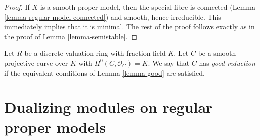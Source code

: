 \begin{proof}
If $X$ is a smooth proper model, then the special fibre is
connected (Lemma \ref{lemma-regular-model-connected})
and smooth, hence irreducible. This immediately implies that
it is minimal. The rest of the proof follows exactly as in
the proof of Lemma \ref{lemma-semistable}.
\end{proof}

\begin{definition}
\label{definition-good}
Let $R$ be a discrete valuation ring with fraction field $K$.
Let $C$ be a smooth projective curve over $K$ with $H^0(C, \mathcal{O}_C) = K$.
We say that $C$ has {\it good reduction} if the equivalent
conditions of Lemma \ref{lemma-good} are satisfied.
\end{definition}














\section{Dualizing modules on regular proper models}
\label{section-dualizing}

